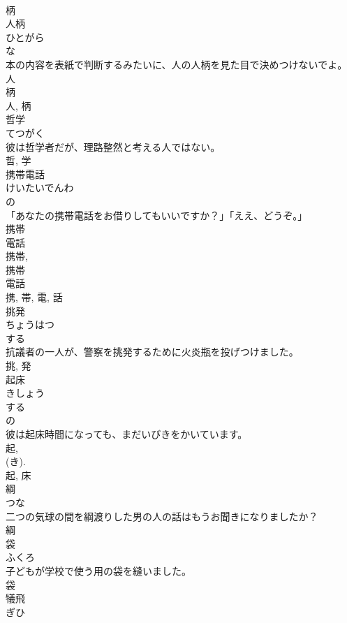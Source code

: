 \documentclass[8pt]{extreport}
\begin{document}
\begin{CJK}{UTF8}{min}
\\	柄	
\\	人柄	
\\	ひとがら	
\\	な 
\\	本の内容を表紙で判断するみたいに、人の人柄を見た目で決めつけないでよ。	
\\	人 
\\	柄 
\\	人, 柄	
\\	哲学	
\\	てつがく	
\\	彼は哲学者だが、理路整然と考える人ではない。	
\\	哲, 学	
\\	携帯電話	
\\	けいたいでんわ	
\\	の 
\\	「あなたの携帯電話をお借りしてもいいですか？」「ええ、どうぞ。」	
\\	携帯 
\\	電話 
\\	携帯, 
\\	携帯 
\\	電話 
\\	携, 帯, 電, 話	
\\	挑発	
\\	ちょうはつ	
\\	する 
\\	抗議者の一人が、警察を挑発するために火炎瓶を投げつけました。	
\\	挑, 発	
\\	起床	
\\	きしょう	
\\	する 
\\	の 
\\	彼は起床時間になっても、まだいびきをかいています。	
\\	起, 
\\	(き). 
\\	起, 床	
\\	綱	
\\	つな	
\\	二つの気球の間を綱渡りした男の人の話はもうお聞きになりましたか？	
\\	綱	
\\	袋	
\\	ふくろ	
\\	子どもが学校で使う用の袋を縫いました。	
\\	袋	
\\	犠飛	
\\	ぎひ	

\end{CJK}
\end{document}
